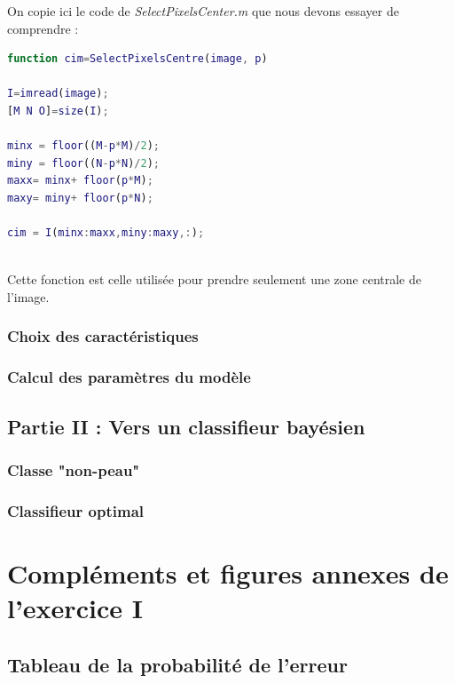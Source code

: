 \documentclass[11pt,a4paper]{article}
\begin{document}
On copie ici le code de \emph{SelectPixelsCenter.m} que nous devons essayer de comprendre :
 
\noindent\hrulefill
\begin{lstlisting}[language=matlab]
function cim=SelectPixelsCentre(image, p)

I=imread(image);
[M N O]=size(I);

minx = floor((M-p*M)/2);
miny = floor((N-p*N)/2);
maxx= minx+ floor(p*M);
maxy= miny+ floor(p*N);

cim = I(minx:maxx,miny:maxy,:);
\end{lstlisting}
\noindent\hrulefill
\\
Cette fonction est celle utilisée pour prendre seulement une zone centrale de l'image.
\subsubsection{Choix des caractéristiques}


\subsubsection{Calcul des paramètres du modèle}
\subsection{Partie II : Vers un classifieur bayésien}
\subsubsection{Classe "non-peau"}


\subsubsection{Classifieur optimal}

\newpage
\appendix
\section{Compléments et figures annexes de l'exercice I}
\subsection{Tableau de la probabilité de l'erreur}
\end{document}
